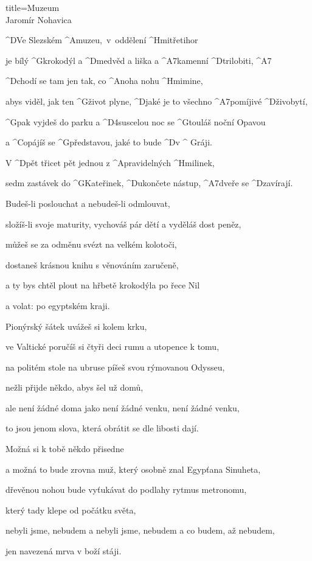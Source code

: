 \begin{song}{title=\predtitle\centering Muzeum \\\large Jaromír Nohavica  \vspace*{-0.3cm}}  %
\begin{centerjustified}

\sloka
	^{D}Ve Slezském ^{A\:\:}muzeu,~v~oddělení ^{Hmi\z}třetihor

	je bílý ^{G\z}krokodýl a ^{D\z}medvěd a liška a ^{A7\z}kamenní ^{D\z}trilobiti, ^{A7}

	^{D\z}chodí se tam jen tak, co ^{A\z}noha nohu ^{Hmi\z}mine,

	abys viděl, jak ten ^{G\z}život plyne, ^{D\z}jaké je to všechno ^{A7\z}pomíjivé ^{D\z}živobytí,

	^{G\z}pak vyjdeš do parku a ^{D4sus}celou noc se ^{G\z}touláš noční Opavou

	a ^{C\z}opájíš se ^{G\z}představou, jaké to bude ^{D}v ^{\,\,G}ráji.


	V ^{D\z}pět třicet pět jednou z ^{A\z}pravidelných ^{Hmi\z}linek,
	
	sedm zastávek do ^{G\z}Kateřinek, ^{D\z}ukončete nástup, ^{A7\z}dveře se ^{D\z}zavírají.


\sloka
	Budeš-li poslouchat a nebudeš-li odmlouvat,
	
	složíš-li svoje maturity, vychováš pár dětí a vyděláš dost peněz,
	
	můžeš se za odměnu svézt na velkém kolotoči,
	
	dostaneš krásnou knihu s věnováním zaručeně,
	
	a ty bys chtěl plout na hřbetě krokodýla po řece Nil
	
	a volat:  po egyptském kraji.
	

\sloka
	Pionýrský šátek uvážeš si kolem krku,
	
	ve Valtické poručíš si čtyři deci rumu a utopence k tomu,
	
	na politém stole na ubruse píšeš svou rýmovanou Odysseu,
	
	nežli přijde někdo, abys šel už domů,
	
	ale není žádné doma jako není žádné venku, není žádné venku,
	
	to jsou jenom slova, která obrátit se dle libosti dají.


\sloka
	Možná si k tobě někdo přisedne
	
	a možná to bude zrovna muž, který osobně znal Egypťana Sinuheta,
	
	dřevěnou nohou bude vyťukávat do podlahy rytmus metronomu,
	
	který tady klepe od počátku světa,
	
	nebyli jsme, nebudem a nebyli jsme, nebudem a co budem, až nebudem,
	
	jen navezená mrva v boží stáji.
	
	

\end{centerjustified}
\setcounter{Slokočet}{0}
\end{song}
